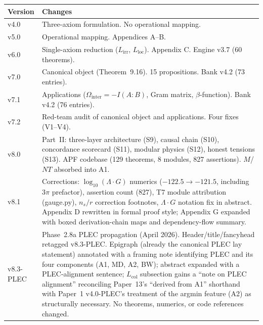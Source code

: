\documentclass[11pt]{article}
\begin{document}
\smallskip
\begin{center}
\small
\begin{tabular}{lp{9cm}}
\toprule
\textbf{Version} & \textbf{Changes} \\
\midrule
v4.0 & Three-axiom formulation.  No operational mapping. \\
v5.0 & Operational mapping.  Appendices A--B. \\
v6.0 & Single-axiom reduction ($L_{\mathrm{irr}}$, $L_{\mathrm{loc}}$).  Appendix C.  Engine v3.7 (60 theorems). \\
v7.0 & Canonical object (Theorem~9.16).  15 propositions.  Bank v4.2 (73 entries). \\
v7.1 & Applications ($\Omega_{\mathrm{inter}} = -I(A{:}B)$, Gram matrix, $\beta$-function).  Bank v4.2 (76 entries). \\
v7.2 & Red-team audit of canonical object and applications.  Four fixes (V1--V4). \\
v8.0 & Part~II: three-layer architecture (S9), causal chain (S10), concordance scorecard (S11), modular physics (S12), honest tensions (S13).  APF codebase (129 theorems, 8 modules, 827 assertions).  $M$/$NT$ absorbed into A1. \\
v8.1 & Corrections: $\log_{10}(\Lambda\!\cdot\! G)$ numerics ($-122.5 \to -121.5$, including $3\pi$ prefactor), assertion count (827), T7 module attribution (gauge.py), $n_s/r$ correction footnotes, $\Lambda\!\cdot\! G$ notation fix in abstract.  Appendix D rewritten in formal proof style; Appendix G expanded with boxed derivation-chain maps and dependency-flow summary. \\
v8.3-PLEC & Phase~2.8a PLEC propagation (April 2026).  Header/title/fancyhead retagged v8.3-PLEC.  Epigraph (already the canonical PLEC lay statement) annotated with a framing note identifying PLEC and its four components (A1, MD, A2, BW); abstract expanded with a PLEC-alignment sentence; $L_{\mathrm{col}}$ subsection gains a ``note on PLEC alignment'' reconciling Paper~13's ``derived from A1'' shorthand with Paper~1 v4.0-PLEC's treatment of the argmin feature (A2) as structurally necessary.  No theorems, numerics, or code references changed. \\
\bottomrule
\end{tabular}
\end{center}
\end{document}

